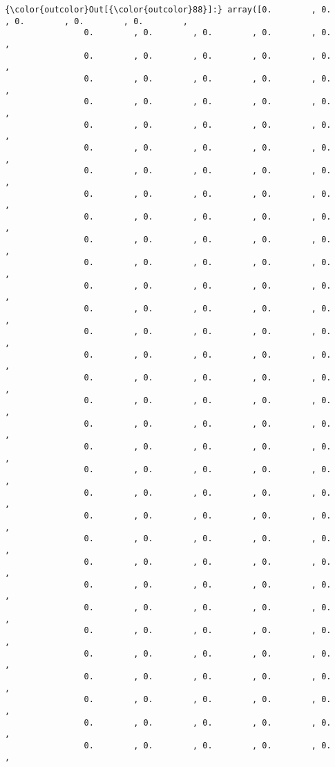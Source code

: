 \documentclass[11pt]{article}
\begin{document}
\begin{Verbatim}[commandchars=\\\{\}]
{\color{outcolor}Out[{\color{outcolor}88}]:} array([0.        , 0.        , 0.        , 0.        , 0.        ,
                0.        , 0.        , 0.        , 0.        , 0.        ,
                0.        , 0.        , 0.        , 0.        , 0.        ,
                0.        , 0.        , 0.        , 0.        , 0.        ,
                0.        , 0.        , 0.        , 0.        , 0.        ,
                0.        , 0.        , 0.        , 0.        , 0.        ,
                0.        , 0.        , 0.        , 0.        , 0.        ,
                0.        , 0.        , 0.        , 0.        , 0.        ,
                0.        , 0.        , 0.        , 0.        , 0.        ,
                0.        , 0.        , 0.        , 0.        , 0.        ,
                0.        , 0.        , 0.        , 0.        , 0.        ,
                0.        , 0.        , 0.        , 0.        , 0.        ,
                0.        , 0.        , 0.        , 0.        , 0.        ,
                0.        , 0.        , 0.        , 0.        , 0.        ,
                0.        , 0.        , 0.        , 0.        , 0.        ,
                0.        , 0.        , 0.        , 0.        , 0.        ,
                0.        , 0.        , 0.        , 0.        , 0.        ,
                0.        , 0.        , 0.        , 0.        , 0.        ,
                0.        , 0.        , 0.        , 0.        , 0.        ,
                0.        , 0.        , 0.        , 0.        , 0.        ,
                0.        , 0.        , 0.        , 0.        , 0.        ,
                0.        , 0.        , 0.        , 0.        , 0.        ,
                0.        , 0.        , 0.        , 0.        , 0.        ,
                0.        , 0.        , 0.        , 0.        , 0.        ,
                0.        , 0.        , 0.        , 0.        , 0.        ,
                0.        , 0.        , 0.        , 0.        , 0.        ,
                0.        , 0.        , 0.        , 0.        , 0.        ,
                0.        , 0.        , 0.        , 0.        , 0.        ,
                0.        , 0.        , 0.        , 0.        , 0.        ,
                0.        , 0.        , 0.        , 0.        , 0.        ,
                0.        , 0.        , 0.        , 0.        , 0.        ,
                0.        , 0.        , 0.        , 0.        , 0.        ,
                0.        , 0.        , 0.        , 0.        , 0.        ,

\end{Verbatim}
\end{document}
